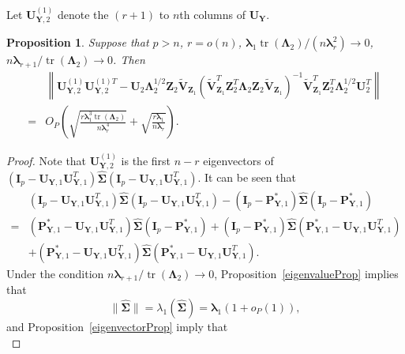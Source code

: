 \documentclass[12pt]{article} %
\DeclareMathOperator{\mytr}{tr}
\newcommand{\bZ}{\mathbf{Z}}
\newcommand{\bP}{\mathbf{P}}
\newcommand{\bY}{\mathbf{Y}}
\newcommand{\bI}{\mathbf{I}}
\newcommand{\bU}{\mathbf{U}}
\newcommand{\bV}{\mathbf{V}}
\newcommand{\bfsym}[1]{\ensuremath{\boldsymbol{#1}}}
\def\blambda {\bfsym {\lambda}}
\def\bLambda {\bfsym {\Lambda}}
\def\bSigma {\bfsym {\Sigma}}
\newtheorem{proposition}{Proposition}
\theoremstyle{definition}
\begin{document}
\begin{appendices}
Let $\bU_{\bY,2}^{(1)}$ denote the $(r+1)$ to $n$th columns of $\bU_\bY$.
\begin{proposition}
    Suppose that $p>n$, $r=o(n)$, ${\blambda_1 \mytr(\bLambda_2)}/{(n \blambda_r^2)}\to 0$, $n\blambda_{r+1} /\mytr(\bLambda_2)\to 0$. Then
    \label{eigenvectorprop2}
    \begin{equation*}
        \begin{split}
            &\left\|\bU_{\bY,2}^{(1)}\bU_{\bY,2}^{(1)T}-
            \bU_2 \bLambda_2^{1/2}\bZ_{2} \tilde{\bV}_{\bZ_1}
            \left(\tilde{\bV}_{\bZ_1}^T \bZ_2^T \bLambda_2 \bZ_2 \tilde{\bV}_{\bZ_1}\right)^{-1}
            \tilde{\bV}_{\bZ_1}^T \bZ_2^T \bLambda_2^{1/2} \bU_2^T
            \right\|
         \\
         =&
        O_P\left(
\sqrt{\frac{r\blambda_1^3 \mytr(\bLambda_2)}{n\blambda_r^4}}
+\sqrt{\frac{r\blambda_1}{n\blambda_r}}
                \right).
        \end{split}
    \end{equation*}
\end{proposition}
\begin{proof}
    Note that $\bU_{\bY,2}^{(1)}$ is the first $n-r$ eigenvectors of $(\bI_p -\bU_{\bY,1}\bU_{\bY,1}^T)\hat{\bSigma}(\bI_p -\bU_{\bY,1}\bU_{\bY,1}^T)$.
    It can be seen that
    \begin{equation*}
        \begin{split}
             &(\bI_p -\bU_{\bY,1}\bU_{\bY,1}^T)\hat{\bSigma}(\bI_p -\bU_{\bY,1}\bU_{\bY,1}^T)
             -
             (\bI_p -\bP^*_{\bY,1})\hat{\bSigma}(\bI_p-\bP^*_{\bY,1})
             \\
             =&
             (\bP^*_{\bY,1}-\bU_{\bY,1}\bU_{\bY,1}^T)\hat{\bSigma}(\bI_p-\bP^*_{\bY,1})
             +(\bI_p-\bP^*_{\bY,1})\hat{\bSigma}(\bP^*_{\bY,1}-\bU_{\bY,1}\bU_{\bY,1}^T)
             \\
             &+
             (\bP^*_{\bY,1}-\bU_{\bY,1}\bU_{\bY,1}^T)\hat{\bSigma}(\bP^*_{\bY,1}-\bU_{\bY,1}\bU_{\bY,1}^T).
        \end{split}
    \end{equation*}
    Under the condition $n\blambda_{r+1}/\mytr(\bLambda_2)\to 0$,  Proposition~\ref{eigenvalueProp} implies that
    \begin{equation*}
        \|\hat{\bSigma}\|=\lambda_1(\hat{\bSigma})=\blambda_1(1+o_P(1)),
    \end{equation*}
    and Proposition~\ref{eigenvectorProp} imply that 
    \begin{equation*}

\end{equation*}
\end{proof}
\end{appendices}
\end{document}

